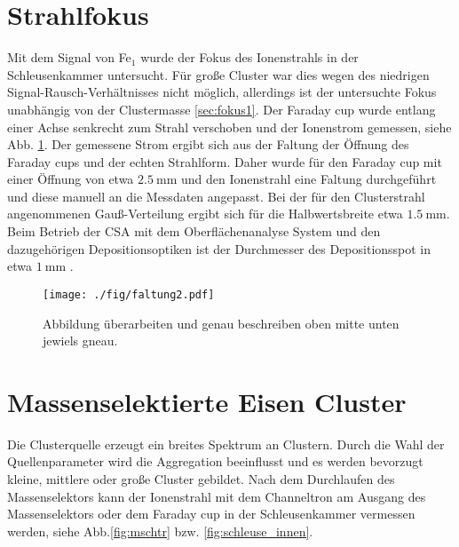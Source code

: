 \section{Strahlfokus}
Mit dem  Signal von Fe$_1$ wurde der Fokus des Ionenstrahls in der Schleusenkammer untersucht.
Für große Cluster war dies wegen des niedrigen Signal-Rausch-Verhältnisses nicht möglich, allerdings ist der untersuchte Fokus unabhängig von der Clustermasse \ref{sec:fokus1}.
Der Faraday cup wurde entlang einer Achse senkrecht zum Strahl verschoben und der Ionenstrom gemessen, siehe Abb. \ref{fig:faltung}.
Der gemessene Strom ergibt sich aus der Faltung der Öffnung des Faraday cups und der echten Strahlform.
Daher wurde für den Faraday cup mit einer Öffnung von etwa $\SI{2.5}{\mm}$ und den Ionenstrahl eine Faltung durchgeführt und diese manuell an die Messdaten angepasst.
Bei der für den Clusterstrahl angenommenen Gauß-Verteilung ergibt sich für die Halbwertsbreite etwa $\SI{1.5}{\mm}$.
Beim Betrieb der CSA mit dem Oberflächenanalyse System und den dazugehörigen Depositionsoptiken ist der Durchmesser des Depositionsspot in etwa $\SI{1}{\mm}$ \cite[S. 40]{gronhagen}.

\begin{figure}
    \centering
    \texttt{[image: ./fig/faltung2.pdf]}
    \caption{Abbildung überarbeiten und genau beschreiben oben mitte unten jewiels gneau.}
    \label{fig:faltung}
\end{figure}


\section{Massenselektierte Eisen Cluster}
Die Clusterquelle erzeugt ein breites Spektrum an Clustern.
Durch die Wahl der Quellenparameter wird die Aggregation beeinflusst und es werden bevorzugt kleine, mittlere oder große Cluster gebildet.
Nach dem Durchlaufen des Massenselektors kann der Ionenstrahl mit dem Channeltron am Ausgang des Massenselektors oder dem Faraday cup in der Schleusenkammer vermessen werden, siehe Abb.\ref{fig:mschtr} bzw. \ref{fig:schleuse_innen}.

